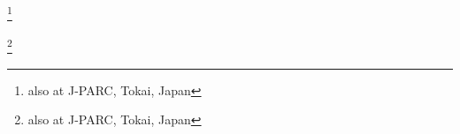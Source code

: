 \documentclass[%
 reprint,
superscriptaddress,
 amsmath,amssymb,
 aps,
]{revtex4-1}
\begin{document}
\author{K.\,Abe}\INSTBJ
\author{J.\,Adam}\INSTFJ
\author{H.\,Aihara}\INSTCH\INSTHA
\author{C.\,Andreopoulos}\INSTEH\INSTFC
\author{S.\,Aoki}\INSTCC
\author{A.\,Ariga}\INSTEE
\author{S.\,Assylbekov}\INSTFG
\author{D.\,Autiero}\INSTJ
\author{M.\,Barbi}\INSTE
\author{G.J.\,Barker}\INSTFD
\author{G.\,Barr}\INSTGG
\author{P.\,Bartet-Friburg}\INSTBB
\author{M.\,Bass}\INSTFG
\author{M.\,Batkiewicz}\INSTDG
\author{F.\,Bay}\INSTEF
\author{V.\,Berardi}\INSTGF
\author{B.E.\,Berger}\INSTFG\INSTHA
\author{S.\,Berkman}\INSTD
\author{S.\,Bhadra}\INSTH
\author{F.d.M.\,Blaszczyk}\INSTFE
\author{A.\,Blondel}\INSTEG
\author{S.\,Bolognesi}\INSTI
\author{S.\,Bordoni }\INSTED
\author{S.B.\,Boyd}\INSTFD
\author{D.\,Brailsford}\INSTEI
\author{A.\,Bravar}\INSTEG
\author{C.\,Bronner}\INSTHA
\author{N.\,Buchanan}\INSTFG
\author{R.G.\,Calland}\INSTHA
\author{J.\,Caravaca Rodr\'iguez}\INSTED
\author{S.L.\,Cartwright}\INSTFB
\author{R.\,Castillo}\INSTED
\author{M.G.\,Catanesi}\INSTGF
\author{A.\,Cervera}\INSTEC
\author{D.\,Cherdack}\INSTFG
\author{N.\,Chikuma}\INSTCH
\author{G.\,Christodoulou}\INSTFC
\author{A.\,Clifton}\INSTFG
\author{J.\,Coleman}\INSTFC
\author{S.J.\,Coleman}\INSTGB
\author{G.\,Collazuol}\INSTBF
\author{K.\,Connolly}\INSTGE
\author{L.\,Cremonesi}\INSTFA
\author{A.\,Dabrowska}\INSTDG
\author{I.\,Danko}\INSTGC
\author{R.\,Das}\INSTFG
\author{S.\,Davis}\INSTGE
\author{P.\,de Perio}\INSTF
\author{G.\,De Rosa}\INSTBE
\author{T.\,Dealtry}\INSTEH\INSTGG
\author{S.R.\,Dennis}\INSTFD\INSTEH
\author{C.\,Densham}\INSTEH
\author{D.\,Dewhurst}\INSTGG
\author{F.\,Di Lodovico}\INSTFA
\author{S.\,Di Luise}\INSTEF
\author{S.\,Dolan}\INSTGG
\author{O.\,Drapier}\INSTBA
\author{K.\,Duffy}\INSTGG
\author{J.\,Dumarchez}\INSTBB
\author{S.\,Dytman}\INSTGC
\author{M.\,Dziewiecki}\INSTDH
\author{S.\,Emery-Schrenk}\INSTI
\author{A.\,Ereditato}\INSTEE
\author{L.\,Escudero}\INSTEC
\author{C.\,Ferchichi}\INSTI
\author{T.\,Feusels}\INSTD
\author{A.J.\,Finch}\INSTEJ
\author{G.A.\,Fiorentini}\INSTH
\author{M.\,Friend}\thanks{also at J-PARC, Tokai, Japan}\INSTCB
\author{Y.\,Fujii}\thanks{also at J-PARC, Tokai, Japan}\INSTCB
\author{Y.\,Fukuda}\INSTCE
\author{A.P.\,Furmanski}\INSTFD
\author{V.\,Galymov}\INSTJ
\author{A.\,Garcia}\INSTED
\author{S.\,Giffin}\INSTE
\author{C.\,Giganti}\INSTBB
\author{K.\,Gilje}\INSTFJ
\author{D.\,Goeldi}\INSTEE
\author{T.\,Golan}\INSTEA
\author{M.\,Gonin}\INSTBA
\author{N.\,Grant}\INSTEJ
\author{D.\,Gudin}\INSTEB
\author{D.R.\,Hadley}\INSTFD
\author{L.\,Haegel}\INSTEG
\author{A.\,Haesler}\INSTEG
\author{M.D.\,Haigh}\INSTFD
\author{P.\,Hamilton}\INSTEI
\author{D.\,Hansen}\INSTGC
\end{document}
